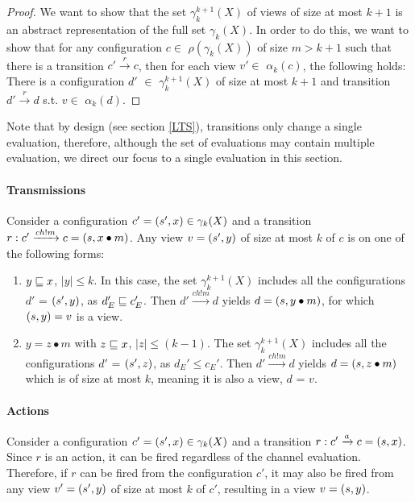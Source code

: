 \begin{proof}
We want to show that the set $\gamma_k^{k+1}(X)$ of views of size at most $k+1$ is an abstract representation of the full set $\gamma_k(X)$. In order to do this, 
we want to show that for any configuration $c \in$ $\rho(\gamma_k(X))$ of size $m > k + 1$ such that there is a transition  $c' \xrightarrow{r} c$, then for each view $v' \in$ $\alpha_k(c)$, the following holds: There is a configuration $d'$ $\in$ $\gamma_k^{k+1}(X)$ of size at most $k+1$ and transition $ d' \xrightarrow{r} d$ s.t. $v \in$ $\alpha_k(d)$.
\end{proof}

Note that by design (see section \ref{LTS}), transitions only change a single evaluation, therefore, although the set of evaluations may contain multiple evaluation, we direct our focus to a single evaluation in this section.

\paragraph{Transmissions}
\label{proofTransmission}
Consider a configuration $c' = (s', x) \in \gamma_k(X)$ and a transition $r: c' \xrightarrow{ch!m} c = (s,x \bullet m)$. Any view $v = (s', y)$ of size at most $k$ of $c$ is on one of the following forms:

\begin{enumerate}
\item
$y \sqsubseteq x$, $|y| \leq k$. In this case, the set $\gamma_k^{k+1}(X)$ includes all the configurations $d'$ = $(s', y)$, as $d_E' \sqsubseteq c_E'$. Then $d' \xrightarrow{ch!m} d$ yields $d = (s, y\bullet m)$, for which $(s, y) = v$ is a view.
\item
$y = z\bullet m$ with $z \sqsubseteq x$, $|z| \leq (k-1)$. The set $\gamma_k^{k+1}(X)$ includes all the configurations $d'$ = $(s', z)$, as $d_E' \leq c_E'$. Then $d' \xrightarrow{ch!m} d$ yields $d = (s, z\bullet m)$ which is of size at most $k$, meaning it is also a view, $d$ = $v$.
\end{enumerate}


\paragraph{Actions}
Consider a configuration $c' = (s', x) \in \gamma_k(X)$ and a transition $r: c' \xrightarrow{a} c = (s, x)$. Since $r$ is an action, it can be fired regardless of the channel evaluation. Therefore, if $r$ can be fired from the configuration $c'$, it may also be fired from any view $v' = (s', y)$ of size at most $k$ of $c'$, resulting in a view $v =  (s, y)$.

